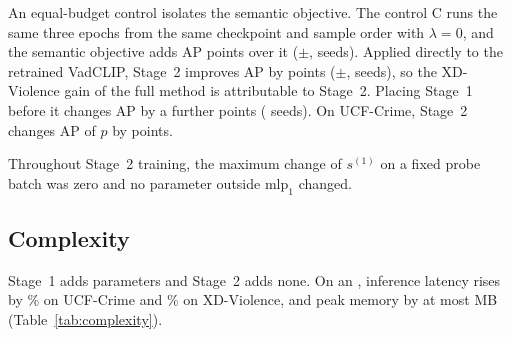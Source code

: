 

An equal-budget control isolates the semantic objective. The control C runs the same three epochs from the same checkpoint and sample order with $\lambda = 0$, and the semantic objective adds \tMinusCMean{} AP points over it ($\pm$\tMinusCSd, \tMinusCPos{} seeds). Applied directly to the retrained VadCLIP, Stage~2 improves AP by \bzTMean{} points ($\pm$\bzTSd, \bzTPos{} seeds), so the XD-Violence gain of the full method is attributable to Stage~2. Placing Stage~1 before it changes AP by a further \tMinusBzTMean{} points (\tMinusBzTPos{} seeds). On UCF-Crime, Stage~2 changes AP of $p$ by \ucfApTwoStageTwoMean{} points.

Throughout Stage~2 training, the maximum change of $s^{(1)}$ on a fixed probe batch was zero and no parameter outside $\mathrm{mlp}_1$ changed.

\subsection{Complexity}
\label{sec:complexity}



Stage~1 adds \pvrParams{} parameters and Stage~2 adds none. On an \cxGpu{}, inference latency rises by \cxUcfLatRel\% on UCF-Crime and \cxXdLatRel\% on XD-Violence, and peak memory by at most \cxUcfMemDelta{} MB (Table~\ref{tab:complexity}).
